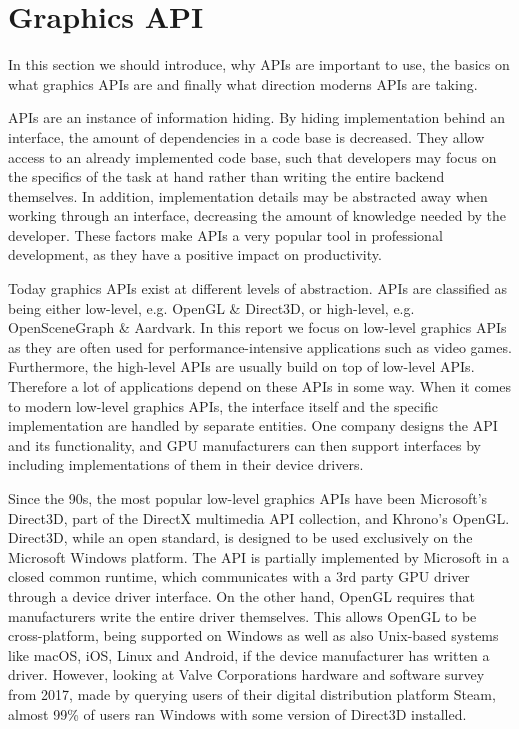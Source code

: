 \section{Graphics \acrshort{API}}\label{sec:graphics_apis}
\begin{sectionmeta}
In this section we should introduce, why \glspl{API} are important to use, the basics on what graphics \glspl{API} are and finally what direction moderns \glspl{API} are taking.
\end{sectionmeta}
\glspl{API} are an instance of information hiding.
By hiding implementation behind an interface, the amount of dependencies in a code base is decreased.  
They allow access to an already implemented code base, such that developers may focus on the specifics of the task at hand rather than writing the entire backend themselves.
In addition, implementation details may be abstracted away when working through an interface,  decreasing the amount of knowledge needed by the developer.
These factors make \glspl{API} a very popular tool in professional development, as they have a positive impact on productivity. 

Today graphics \glspl{API} exist at different levels of abstraction. 
\glspl{API} are classified as being either low-level, e.g. OpenGL \& Direct3D, or high-level, e.g. OpenSceneGraph \& Aardvark.
In this report we focus on low-level graphics \glspl{API} as they are often used for performance-intensive applications such as video games.
Furthermore, the high-level \glspl{API} are usually build on top of low-level \glspl{API}.  
Therefore a lot of applications depend on these \glspl{API} in some way.
When it comes to modern low-level graphics \glspl{API}, the interface itself and the specific implementation are handled by separate entities. 
One company designs the \gls{API} and its functionality, and \gls{GPU} manufacturers can then support interfaces by including implementations of them in their device drivers.

Since the 90s, the most popular low-level graphics \glspl{API} have been Microsoft’s Direct3D, part of the DirectX multimedia \gls{API} collection, and Khrono’s OpenGL. 
Direct3D, while an open standard, is designed to be used exclusively on the Microsoft Windows platform.
The \gls{API} is partially implemented by Microsoft in a closed common runtime, which communicates with a 3rd party \gls{GPU} driver through a device driver interface.
On the other hand, OpenGL requires that manufacturers write the entire driver themselves.
This allows OpenGL to be cross-platform, being supported on Windows as well as also Unix-based systems like macOS, iOS, Linux and Android, if the device manufacturer has written a driver.
However, looking at Valve Corporations hardware and software survey from 2017\cite{steamsurvey}, made by querying users of their digital distribution platform Steam,  almost 99\% of users ran Windows with some version of Direct3D installed. 

